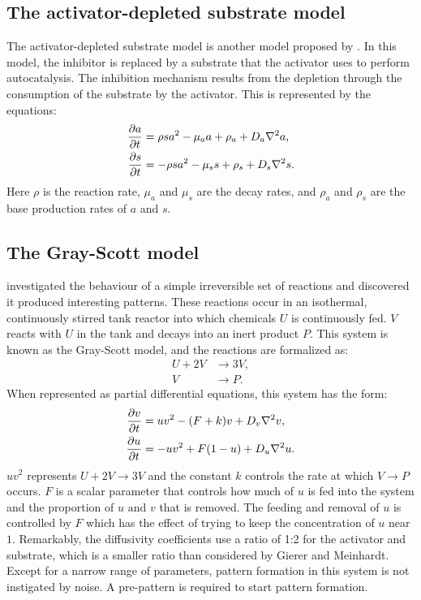 \subsection{The activator-depleted substrate model}
The activator-depleted substrate model is another model proposed by \citet{gierer1972}. In this model, the inhibitor is replaced by a substrate that the activator uses to perform autocatalysis. The inhibition mechanism results from the depletion through the consumption of the substrate by the activator. This is represented by the equations:
	\begin{equation}
	\begin{aligned} \label{eq:activatorSubstrateRD}
		\frac{\partial a}{\partial t} &= \rho sa^2 - \mu_a a + \rho_a + D_a \nabla^2 a,\\
		\frac{\partial s}{\partial t} &= -\rho sa^2 - \mu_s s + \rho_s + D_s \nabla^2 s.
	\end{aligned}
	\end{equation}
Here $\rho$ is the reaction rate, $\mu_a$ and $\mu_s$ are the decay rates, and $\rho_a$ and $\rho_s$ are the base production rates of $a$ and $s$.

\subsection{The Gray-Scott model}
\citet{gray1984} investigated the behaviour of a simple irreversible set of reactions and discovered it produced interesting patterns. These reactions occur in an isothermal, continuously stirred tank reactor into which chemicals $U$ is continuously fed. $V$ reacts with $U$ in the tank and decays into an inert product $P$. This system is known as the Gray-Scott model, and the reactions are formalized as:
	\begin{equation}
	\begin{aligned}
		U + 2V &\to 3V, \\
		V &\to P.
	\end{aligned}
	\end{equation}
When represented as partial differential equations, this system has the form:
	\begin{equation}
	\begin{aligned} \label{eq:grayscottRD}
		\frac{\partial v}{\partial t} &= uv^2 - (F+k)v + D_v \nabla^2 v,\\
		\frac{\partial u}{\partial t} &= -uv^2 + F(1-u) + D_u \nabla^2 u.
	\end{aligned}
	\end{equation}
$uv^2$ represents $U + 2V \to 3V$ and the constant $k$ controls the rate at which $V \to P$ occurs. $F$ is a scalar parameter that controls how much of $u$ is fed into the system and the proportion of $u \text{ and } v$ that is removed. The feeding and removal of $u$ is controlled by $F$ which has the effect of trying to keep the concentration of $u$ near $1$. Remarkably, the diffusivity coefficients use a ratio of 1:2 for the activator and substrate, which is a smaller ratio than considered by Gierer and Meinhardt. Except for a narrow range of parameters, pattern formation in this system is not instigated by noise. A pre-pattern is required to start pattern formation. 

